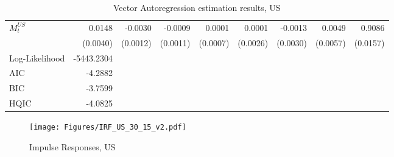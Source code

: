\begin{sidewaystable}
\begin{tabular}{lrrrrrrrr}
    $M^{US}_{t}$ & 0.0148 & -0.0030 & -0.0009 & 0.0001 & 0.0001 & -0.0013 & 0.0049 & 0.9086 \\
     & (0.0040) & (0.0012) & (0.0011) & (0.0007) & (0.0026) & (0.0030) & (0.0057) & (0.0157) \\
    \midrule
    Log-Likelihood & -5443.2304 \\
    AIC & -4.2882 \\
    BIC & -3.7599 \\
    HQIC & -4.0825 \\
    \bottomrule
    \end{tabular}
    \caption{Vector Autoregression estimation results, US}
    \label{tab:VAR_output_US_v2}
\end{sidewaystable}


\begin{sidewaysfigure}
    \centering
    \texttt{[image: Figures/IRF\_US\_30\_15\_v2.pdf]}
    \caption{Impulse Responses, US}
    \label{fig:IRF_US}
\end{sidewaysfigure}

